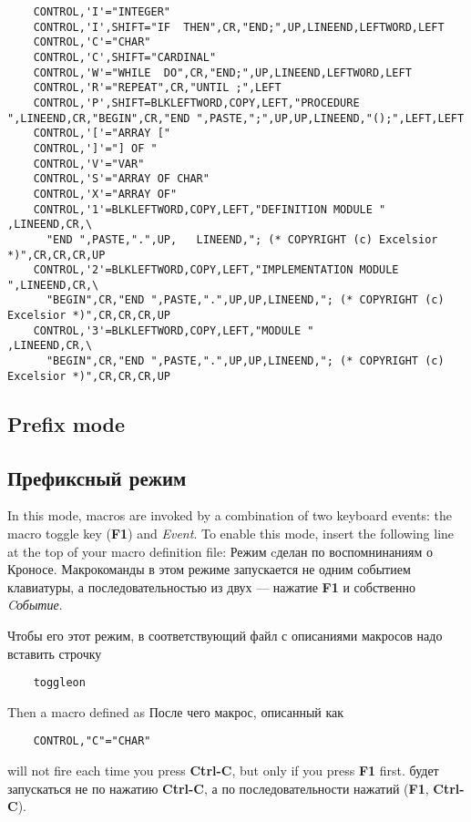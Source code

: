\begin{verbatim}
    CONTROL,'I'="INTEGER"
    CONTROL,'I',SHIFT="IF  THEN",CR,"END;",UP,LINEEND,LEFTWORD,LEFT
    CONTROL,'C'="CHAR"
    CONTROL,'C',SHIFT="CARDINAL"
    CONTROL,'W'="WHILE  DO",CR,"END;",UP,LINEEND,LEFTWORD,LEFT
    CONTROL,'R'="REPEAT",CR,"UNTIL ;",LEFT
    CONTROL,'P',SHIFT=BLKLEFTWORD,COPY,LEFT,"PROCEDURE ",LINEEND,CR,"BEGIN",CR,"END ",PASTE,";",UP,UP,LINEEND,"();",LEFT,LEFT
    CONTROL,'['="ARRAY ["
    CONTROL,']'="] OF "
    CONTROL,'V'="VAR"
    CONTROL,'S'="ARRAY OF CHAR"
    CONTROL,'X'="ARRAY OF"
    CONTROL,'1'=BLKLEFTWORD,COPY,LEFT,"DEFINITION MODULE "    ,LINEEND,CR,\
      "END ",PASTE,".",UP,   LINEEND,"; (* COPYRIGHT (c) Excelsior *)",CR,CR,CR,UP
    CONTROL,'2'=BLKLEFTWORD,COPY,LEFT,"IMPLEMENTATION MODULE ",LINEEND,CR,\
      "BEGIN",CR,"END ",PASTE,".",UP,UP,LINEEND,"; (* COPYRIGHT (c) Excelsior *)",CR,CR,CR,UP
    CONTROL,'3'=BLKLEFTWORD,COPY,LEFT,"MODULE "               ,LINEEND,CR,\
      "BEGIN",CR,"END ",PASTE,".",UP,UP,LINEEND,"; (* COPYRIGHT (c) Excelsior *)",CR,CR,CR,UP
\end{verbatim}


\ifenglish
\subsection{Prefix mode}
\else
\subsection{Префиксный режим}
\fi

\ifenglish
In this mode, macros are invoked by a combination of two keyboard events:
the macro toggle key ({\bf F1}) and {\it Event}. 
To enable this mode, insert the following line at the top of your 
macro definition file:
\else
Режим cделан по воспомнинаниям о Кроносе. 
Макрокоманды в этом режиме запускается не одним событием клавиатуры, 
а последовательностью из двух --- нажатие {\bf F1} и собственно {\it Cобытие}. 

Чтобы его этот режим, в соответствующий файл с описаниями макросов 
надо вставить строчку
\fi

\verb'    toggleon'

\ifenglish
Then a macro defined as
\else
После чего макрос, описанный как
\fi

\verb'    CONTROL,"C"="CHAR"'

\ifenglish
will not fire each time you press {\bf Ctrl-C}, but only if you press
{\bf F1} first.
\else
будет запускаться не по нажатию {\bf Ctrl-C}, а по последовательности нажатий
({\bf F1}, {\bf Ctrl-C}).
\fi

